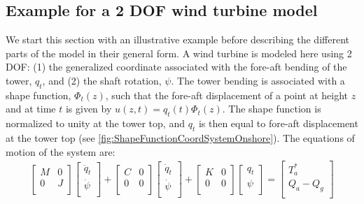 \documentclass[wes, manuscript]{copernicus}
\begin{document}
\subsection{Example for a 2 DOF wind turbine model}
\label{sec:TwoDof}
We start this section with an illustrative example before describing the different parts of the model in their general form. A wind turbine is modeled here using 2 DOF: (1) the generalized coordinate associated with the fore-aft bending  of the tower, $q_{t}$, and (2) the shaft rotation, $\psi$. The tower bending is associated with a shape function, $\Phi_{t}(z)$, such that the fore-aft displacement of a point at height $z$ and at time $t$ is given by $u(z,t)=q_{t}(t) \Phi_{t}(z)$. The shape function is normalized to unity at the tower top, and $q_t$ is then equal to fore-aft displacement at the tower top (see \autoref{fig:ShapeFunctionCoordSystemOnshore}).
The equations of motion of the system are:
\begin{align}
  \begin{bmatrix} 
  M & 0\\
  0  & J\\
  \end{bmatrix} 
  \begin{bmatrix} 
  \ddot{q}_t\\
  \ddot{\psi}\\
  \end{bmatrix} 
  +
  \begin{bmatrix} 
  C& 0\\
  0& 0\\
  \end{bmatrix} 
  \begin{bmatrix} 
  \dot{q}_t\\
  \dot{\psi}\\
  \end{bmatrix} 
  +
  \begin{bmatrix} 
  K& 0\\
  0& 0\\
  \end{bmatrix} 
  \begin{bmatrix} 
  q_t\\
  \psi\\
  \end{bmatrix} 
  =
  \begin{bmatrix} 
   T_a^*\\
  Q_a-Q_g\\
  \end{bmatrix} 
  \label{eq:Mech2DOF}
\end{align}
\end{document}
